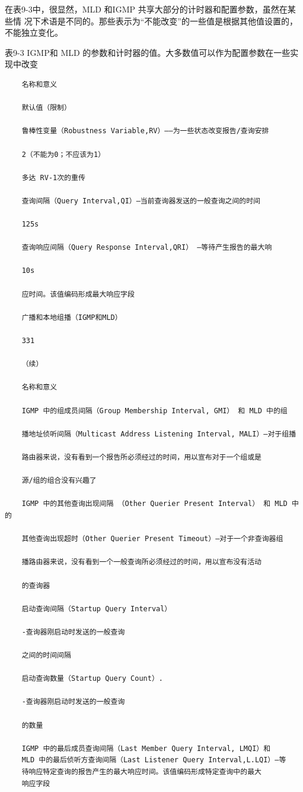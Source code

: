在表9-3中，很显然，MLD 和IGMP 共享大部分的计时器和配置参数，虽然在某些情
况下术语是不同的。那些表示为“不能改变”的一些值是根据其他值设置的，不能独立变化。

表9-3 IGMP和 MLD 的参数和计时器的值。大多数值可以作为配置参数在一些实现中改变

\begin{verbatim}
    名称和意义

    默认值（限制）

    鲁棒性变量（Robustness Variable,RV）——为一些状态改变报告/查询安排

    2（不能为0；不应该为1）

    多达 RV-1次的重传

    查询间隔（Query Interval,QI）—当前查询器发送的一般查询之间的时间

    125s

    查询响应间隔（Query Response Interval,QRI） —等待产生报告的最大响

    10s

    应时间。该值编码形成最大响应字段

    广播和本地组播（IGMP和MLD）

    331

    （续）

    名称和意义

    IGMP 中的组成员间隔（Group Membership Interval, GMI） 和 MLD 中的组

    播地址侦听间隔（Multicast Address Listening Interval, MALI）—对于组播

    路由器来说，没有看到一个报告所必须经过的时间，用以宣布对于一个组或是

    源/组的组合没有兴趣了

    IGMP 中的其他查询出现间隔 （Other Querier Present Interval） 和 MLD 中的

    其他查询出现超时（Other Querier Present Timeout）—对于一个非查询器组

    播路由器来说，没有看到一个一般查询所必须经过的时间，用以宣布没有活动

    的查询器

    启动查询间隔（Startup Query Interval）

    -查询器刚启动时发送的一般查询

    之间的时间间隔

    启动查询数量（Startup Query Count）.

    -查询器刚启动时发送的一般查询

    的数量

    IGMP 中的最后成员查询间隔（Last Member Query Interval, LMQI）和
    MLD 中的最后侦听方查询间隔（Last Listener Query Interval,L.LQI）—等
    待响应特定查询的报告产生的最大响应时间。该值编码形成特定查询中的最大
    响应字段


\end{verbatim}
